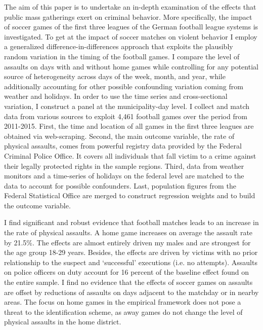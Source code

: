 \documentclass[11pt, a4paper]{article} %
\begin{document}
The aim of this paper is to undertake an in-depth examination of the effects that public mass gatherings exert on criminal behavior. More specifically, the impact of soccer games of the first three leagues of the German football league systems is investigated. To get at the impact of soccer matches on violent behavior I employ a generalized difference-in-differences approach that exploits the plausibly random variation in the timing of the football games. I compare the level of assaults on days with and without home games while controlling for any potential source of heterogeneity across days of the week, month, and year, while additionally accounting for other possible confounding variation coming from weather and holidays. In order to use the time series and cross-sectional variation, I construct a panel at the municipality-day level. I collect and match data from various sources to exploit 4,461 football games over the period from 2011-2015. First, the time and location of all games in the first three leagues are obtained via web-scraping. Second, the main outcome variable, the rate of physical assaults, comes from powerful registry data provided by the Federal Criminal Police Office. It covers all individuals that fall victim to a crime against their legally protected rights in the sample regions. Third, data from weather monitors and a time-series of holidays on the federal level are matched to the data to account for possible confounders. Last, population figures from the Federal Statistical Office are merged to construct regression weights and to build the outcome variable. 



I find significant and robust evidence that football matches leads to an increase in the rate of physical assaults. A home game increases on average the assault rate by 21.5\%. The effects are almost entirely driven my males and are strongest for the age group 18-29 years. Besides, the effects are driven by victims with no prior relationship to the suspect and `successful' executions (i.e. no attempts). Assaults on police officers on duty account for 16 percent of the baseline effect found on the entire sample. I find no evidence that the effects of soccer games on assaults are offset by reductions of assaults on days adjacent to the matchday or in nearby areas. The focus on home games in the empirical framework does not pose a threat to the identification scheme, as away games do not change the level of physical assaults in the home district.
\end{document}
